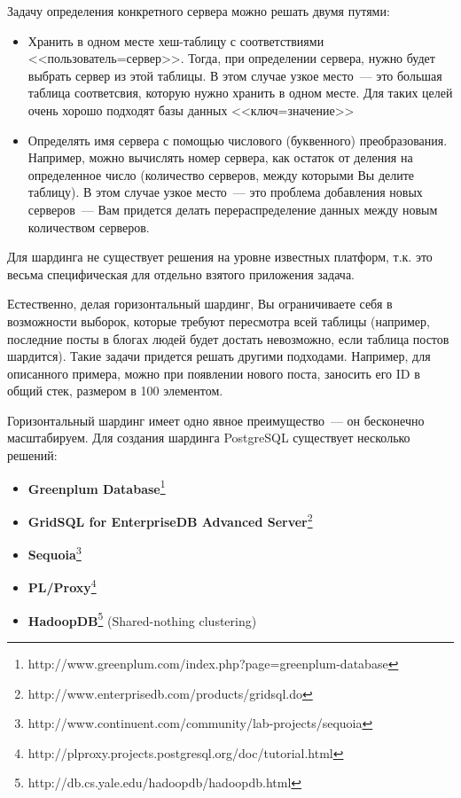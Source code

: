 Задачу определения конкретного сервера можно решать двумя путями:
\begin{itemize}
\item Хранить в одном месте хеш-таблицу с соответствиями <<пользователь=сервер>>. Тогда, при определении сервера, нужно будет 
выбрать сервер из этой таблицы. В этом случае узкое место~--- это большая таблица соответсвия, которую нужно хранить в одном месте. 
Для таких целей очень хорошо подходят базы данных <<ключ=значение>>
\item Определять имя сервера с помощью числового (буквенного) преобразования. Например, можно вычислять номер сервера, 
как остаток от деления на определенное число (количество серверов, между которыми Вы делите таблицу). В этом случае узкое место~--- 
это проблема добавления новых серверов~--- Вам придется делать перераспределение данных между новым количеством серверов.
\end{itemize}

Для шардинга не существует решения на уровне известных платформ, т.к. это весьма специфическая для отдельно взятого приложения задача.

Естественно, делая горизонтальный шардинг, Вы ограничиваете себя в возможности выборок, которые требуют 
пересмотра всей таблицы (например, последние посты в блогах людей будет достать невозможно, если таблица постов шардится). 
Такие задачи придется решать другими подходами. Например, для описанного примера, можно при появлении нового поста, заносить 
его ID в общий стек, размером в 100 элементом.

Горизонтальный шардинг имеет одно явное преимущество~--- он бесконечно масштабируем.
Для создания шардинга PostgreSQL существует несколько решений:
\begin{itemize}
\item \textbf{Greenplum Database}\footnote{http://www.greenplum.com/index.php?page=greenplum-database}
\item \textbf{GridSQL for EnterpriseDB Advanced Server}\footnote{http://www.enterprisedb.com/products/gridsql.do}
\item \textbf{Sequoia}\footnote{http://www.continuent.com/community/lab-projects/sequoia}
\item \textbf{PL/Proxy}\footnote{http://plproxy.projects.postgresql.org/doc/tutorial.html}
\item \textbf{HadoopDB}\footnote{http://db.cs.yale.edu/hadoopdb/hadoopdb.html} (Shared-nothing clustering)
\end{itemize}